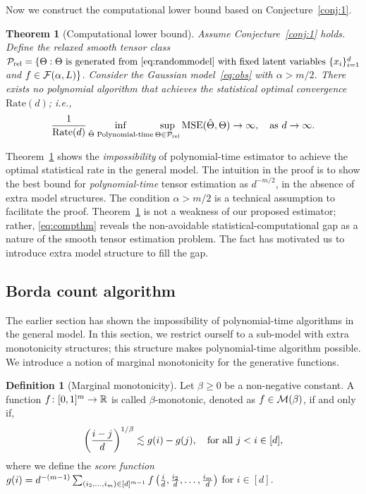 \documentclass[12pt]{article}
\newtheorem{thm}{Theorem}
\theoremstyle{definition}
\newtheorem{defn}{Definition}
\begin{document}
{{Now we construct the computational lower bound based on Conjecture~\ref{conj:1}. 

\begin{thm}[Computational lower bound]\label{thm:nopoly} Assume Conjecture~\ref{conj:1} holds. Define the relaxed smooth tensor class 
$
\mathcal{P}_{\textup{rel}}=\{\Theta: \Theta \text{ is generated from~\eqref{eq:randommodel} with fixed latent variables $\{x_i\}_{i=1}^d$}$
and $f\in \mathcal{F}(\alpha,L)\}$. 
Consider the Gaussian model~\eqref{eq:obs} with $\alpha> m/2$. There exists no polynomial algorithm that achieves the statistical optimal convergence $\text{Rate}(d)$; i.e., 
\begin{align}\label{eq:compthm}
\frac{1}{\textup{Rate}(d)}\inf_{\hat \Theta \textup{ Polynomial-time}}\sup_{\Theta\in\mathcal{P}_{\textup{rel}}}\textup{MSE}(\hat\Theta,\Theta)\rightarrow \infty, \quad \text{as}\ d\to\infty.
\end{align}
\end{thm}
Theorem~\ref{thm:nopoly} shows the \emph{impossibility} of polynomial-time estimator to achieve the optimal statistical rate in the general model. The intuition in the proof is to show the best bound for \emph{polynomial-time} tensor estimation as $d^{-m/2}$, in the absence of extra model structures. The condition $\alpha>m/2$ is a technical assumption to facilitate the proof. 
Theorem~\ref{thm:nopoly} is not a weakness of our proposed estimator; rather, \eqref{eq:compthm} reveals the non-avoidable statistical-computational gap as a nature of the smooth tensor estimation problem. The fact has motivated us to introduce extra model structure to fill the gap.}

\subsection{Borda count algorithm}
{\color{blue}The earlier section has shown the impossibility of polynomial-time algorithms in the general model. In this section, we restrict ourself to a sub-model with extra monotonicity structures; this structure makes polynomial-time algorithm possible.} We introduce a notion of marginal monotonicity for the generative functions.}


\begin{defn}[Marginal monotonicity]\label{eq:bdefn}
Let $\beta\geq 0$ be a non-negative constant. A function $f\colon[0,1]^m \rightarrow \mathbb{R}$ is called $\beta$-monotonic, denoted as $f\in\mathcal{M}(\beta)$, if and only if, 
\begin{align}\label{eq:monotonic}
   \left({i-j\over d}\right)^{1/\beta}  \lesssim g(i)-g(j),\quad \text{for all } j<i\in[d], 
   \end{align}
where we define the \emph{score function} $g(i) = d^{-(m-1)}\sum_{(i_2,\ldots,i_m)\in[d]^{m-1}} f\left({i\over d},{i_2\over d},\ldots,{i_m\over d}\right)$ for $i \in[d]$.
\end{defn}
\end{document}
